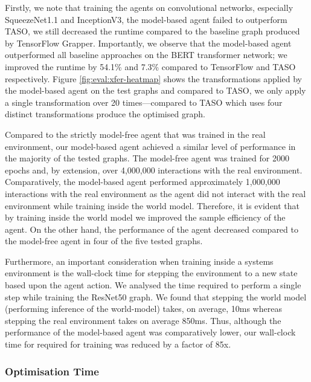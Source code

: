 Firstly, we note that training the agents on convolutional networks, especially SqueezeNet1.1 and InceptionV3, the model-based agent failed to outperform TASO, we still decreased the runtime compared to the baseline graph produced by TensorFlow Grapper. Importantly, we observe that the model-based agent outperformed all baseline approaches on the BERT transformer network; we improved the runtime by 54.1\% and 7.3\% compared to TensorFlow and TASO respectively. Figure \ref{fig:eval:xfer-heatmap} shows the transformations applied by the model-based agent on the test graphs and compared to TASO, we only apply a single transformation over 20 times---compared to TASO which uses four distinct transformations produce the optimised graph.


Compared to the strictly model-free agent that was trained in the real environment, our model-based agent achieved a similar level of performance in the majority of the tested graphs. The model-free agent was trained for 2000 epochs and, by extension, over 4,000,000 interactions with the real environment. Comparatively, the model-based agent performed approximately 1,000,000 interactions with the real environment as the agent did not interact with the real environment while training inside the world model. Therefore, it is evident that by training inside the world model we improved the sample efficiency of the agent. On the other hand, the performance of the agent decreased compared to the model-free agent in four of the five tested graphs.

Furthermore, an important consideration when training inside a systems environment is the wall-clock time for stepping the environment to a new state based upon the agent action. We analysed the time required to perform a single step while training the ResNet50 graph. We found that stepping the world model (performing inference of the world-model) takes, on average, 10ms whereas stepping the real environment takes on average 850ms. Thus, although the performance of the model-based agent was comparatively lower, our wall-clock time for required for training was reduced by a factor of 85x.

\subsubsection{Optimisation Time}

